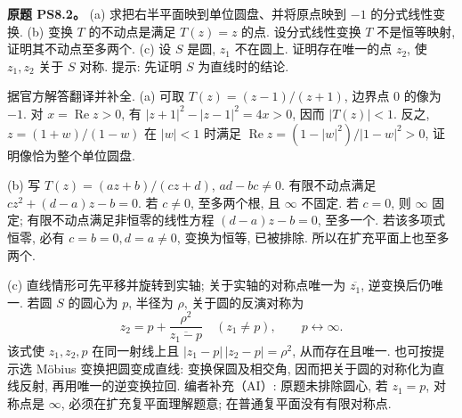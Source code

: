 \begin{exercise}
\textbf{原题 PS8.2。}\label{ass:ps8-2}
(a) 求把右半平面映到单位圆盘、并将原点映到 $-1$ 的分式线性变换.
(b) 变换 $T$ 的不动点是满足 $T(z)=z$ 的点. 设分式线性变换 $T$ 不是恒等映射, 证明其不动点至多两个.
(c) 设 $S$ 是圆, $z_1$ 不在圆上. 证明存在唯一的点 $z_2$, 使 $z_1,z_2$ 关于 $S$ 对称. 提示: 先证明 $S$ 为直线时的结论.
\end{exercise}
\begin{solution}
据官方解答翻译并补全.
(a) 可取 $T(z)=(z-1)/(z+1)$, 边界点 $0$ 的像为 $-1$. 对 $x=\operatorname{Re}z>0$, 有 $|z+1|^2-|z-1|^2=4x>0$, 因而 $|T(z)|<1$. 反之, $z=(1+w)/(1-w)$ 在 $|w|<1$ 时满足 $\operatorname{Re}z=(1-|w|^2)/|1-w|^2>0$, 证明像恰为整个单位圆盘.

(b) 写 $T(z)=(az+b)/(cz+d)$, $ad-bc\ne0$. 有限不动点满足 $cz^2+(d-a)z-b=0$. 若 $c\ne0$, 至多两个根, 且 $\infty$ 不固定. 若 $c=0$, 则 $\infty$ 固定; 有限不动点满足非恒零的线性方程 $(d-a)z-b=0$, 至多一个. 若该多项式恒零, 必有 $c=b=0,d=a\ne0$, 变换为恒等, 已被排除. 所以在扩充平面上也至多两个.

(c) 直线情形可先平移并旋转到实轴; 关于实轴的对称点唯一为 $\overline{z_1}$, 逆变换后仍唯一. 若圆 $S$ 的圆心为 $p$, 半径为 $\rho$, 关于圆的反演对称为
\[
 z_2=p+\frac{\rho^2}{\overline{z_1-p}}\quad(z_1\ne p),\qquad
 p\longleftrightarrow\infty.
\]
该式使 $z_1,z_2,p$ 在同一射线上且 $|z_1-p|\,|z_2-p|=\rho^2$, 从而存在且唯一. 也可按提示选 Möbius 变换把圆变成直线: 变换保圆及相交角, 因而把关于圆的对称化为直线反射, 再用唯一的逆变换拉回.
编者补充（AI）: 原题未排除圆心, 若 $z_1=p$, 对称点是 $\infty$, 必须在扩充复平面理解题意; 在普通复平面没有有限对称点.
\end{solution}

